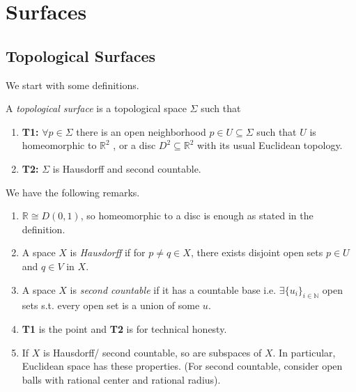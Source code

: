 \section{Surfaces}
\subsection{Topological Surfaces}
We start with some definitions.
\begin{definition}{}{}
    A \textit{topological surface} is a topological space \(\Sigma\) such that
    \begin{enumerate}
        \item \textbf{T1:} \(\forall p \in \Sigma\) there is an open neighborhood \(p \in U \subseteq \Sigma\) such that \(U\) is homeomorphic to \(\mathbb{R}^2\) , or a disc \(D^2 \subseteq \mathbb{R}^2\) with its usual Euclidean topology.
        \item \textbf{T2:} \(\Sigma\) is Hausdorff and second countable.
    \end{enumerate}
\end{definition}
\begin{remark}
    We have the following remarks.
    \begin{enumerate}
        \item \(\mathbb{R}\cong D(0,1)\), so homeomorphic to a disc is enough as stated in the definition.
        \item A space \(X\) is \textit{Hausdorff} if for \(p \neq q \in X\), there exists disjoint open sets \(p \in U\) and \(q \in V\) in \(X\).
        \item A space \(X\) is \textit{second countable} if it has a countable base i.e. \(\exists \{u_i\}_{i \in \mathbb{N}}\) open sets s.t. every open set is a union of some \(u\).
        \item \textbf{T1} is the point and \textbf{T2} is for technical honesty.
        \item If \(X\) is Hausdorff/ second countable, so are subspaces of \(X\). In particular, Euclidean space has these properties. (For second countable, consider open balls with rational center and rational radius).
    \end{enumerate}
\end{remark}
